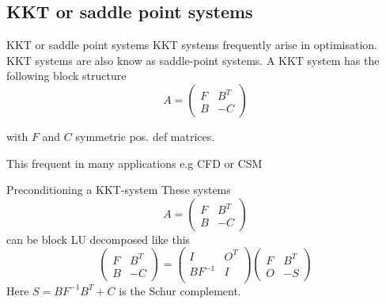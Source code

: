 \subsection{KKT or saddle point systems}
\begin{frame}{KKT or saddle point systems}
  KKT systems frequently arise in optimisation. KKT systems are
also know as saddle-point systems. A KKT system has the
following block structure
\begin{equation*}
  A=
  \begin{pmatrix}
    F & B^T\\
    B & -C
  \end{pmatrix}

\end{equation*}

with $F$ and $C$ symmetric pos. def matrices.

This frequent in many applications e.g CFD or CSM
\end{frame}

\begin{frame}{Preconditioning a KKT-system}
  These systems
  \begin{equation*}
    A=
    \begin{pmatrix}
      F & B^T\\
      B & -C
    \end{pmatrix}

  \end{equation*}
  can be block LU decomposed like this
  \begin{equation*}
    \begin{pmatrix}
F & B^T\\
B & -C
\end{pmatrix} =
\begin{pmatrix}
I& O^T\\
BF^{-1} & I\\
\end{pmatrix}
\begin{pmatrix}
F & B^T\\
O & -S
\end{pmatrix}
  \end{equation*}
Here $S = BF^{-1}B^T + C$ is the Schur complement.
\end{frame}

